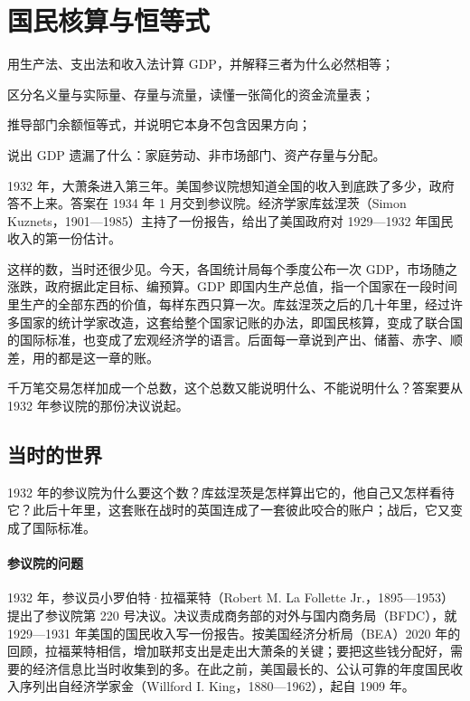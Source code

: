 \chapter{国民核算与恒等式}\label{ch:accounts}

\begin{chapterguide}
\begin{guidegoals}
\item 用生产法、支出法和收入法计算 GDP，并解释三者为什么必然相等；
\item 区分名义量与实际量、存量与流量，读懂一张简化的资金流量表；
\item 推导部门余额恒等式，并说明它本身不包含因果方向；
\item 说出 GDP 遗漏了什么：家庭劳动、非市场部门、资产存量与分配。
\end{guidegoals}
\end{chapterguide}

1932 年，大萧条进入第三年。美国参议院想知道全国的收入到底跌了多少，政府答不上来。答案在 1934 年 1 月交到参议院。经济学家库兹涅茨（Simon Kuznets，1901—1985）主持了一份报告，给出了美国政府对 1929—1932 年国民收入的第一份估计。

这样的数，当时还很少见。今天，各国统计局每个季度公布一次 GDP，市场随之涨跌，政府据此定目标、编预算。GDP 即国内生产总值，指一个国家在一段时间里生产的全部东西的价值，每样东西只算一次。库兹涅茨之后的几十年里，经过许多国家的统计学家改造，这套给整个国家记账的办法，即国民核算，变成了联合国的国际标准，也变成了宏观经济学的语言。后面每一章说到产出、储蓄、赤字、顺差，用的都是这一章的账。

千万笔交易怎样加成一个总数，这个总数又能说明什么、不能说明什么？答案要从 1932 年参议院的那份决议说起。

\section{当时的世界}\label{sec:accounts-world}

1932 年的参议院为什么要这个数？库兹涅茨是怎样算出它的，他自己又怎样看待它？此后十年里，这套账在战时的英国连成了一套彼此咬合的账户；战后，它又变成了国际标准。

\subsubsection{参议院的问题}
1932 年，参议员小罗伯特·拉福莱特（Robert M. La Follette Jr.，1895—1953）提出了参议院第 220 号决议。决议责成商务部的对外与国内商务局（BFDC），就 1929—1931 年美国的国民收入写一份报告。按美国经济分析局（BEA）2020 年的回顾，拉福莱特相信，增加联邦支出是走出大萧条的关键；要把这些钱分配好，需要的经济信息比当时收集到的多\cite{bea2020}。在此之前，美国最长的、公认可靠的年度国民收入序列出自经济学家金（Willford I. King，1880—1962），起自 1909 年\cite{kuznets1934}。

